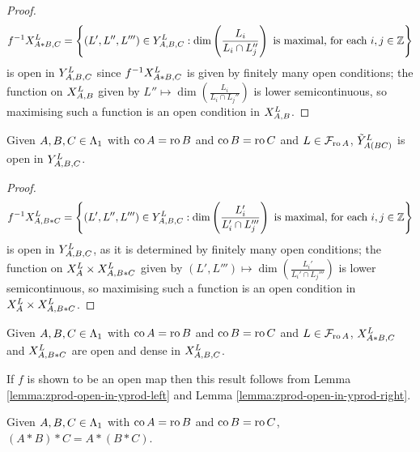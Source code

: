 \documentclass[a4paper, 11pt]{report}
\begin{document}
\begin{proof}
\begin{equation*}
f^{-1}\xprod[L]{A\ast B,C} = \left\{ (L',L'',L''')\in\yprod[L]{A,B,C}: \dim\left(\frac{L_i}{L_i\cap L_j''}\right) \text{ is maximal, for each }i,j\in\integers \right\}
\end{equation*}
is open in $\yprod[L]{A,B,C}$ since $f^{-1}\xprod[L]{A\ast B,C}$ is given by {\color{blue}finitely many} open conditions; the function on $\xprod[L]{A,B}$ given by $L''\mapsto \dim\left(\frac{L_i}{L_i\cap L_j''}\right)$ is lower semicontinuous, so maximising such a function is an open condition in $\xprod[L]{A,B}$.
\end{proof}

\begin{lemma}\label{lemma:zprod-open-in-yprod-right}
Given $A,B,C\in\matrices$ with $\co{A}=\ro{B}$ and $\co{B}=\ro{C}$ and $L\in\flags_{\ro{A}}$, $\zprod[L]{A(BC)}$ is open in $\yprod[L]{A,B,C}$.
\end{lemma}

\begin{proof}
\begin{equation*}
f^{-1}\xprod[L]{A,B\ast C} = \left\{ (L',L'',L''')\in\yprod[L]{A,B,C}: \dim\left(\frac{L_i'}{L_i'\cap L_j'''}\right) \text{ is maximal, for each }i,j\in\integers \right\}
\end{equation*}
is open in $\yprod[L]{A,B,C}$, as it is determined by {\color{blue}finitely many} open conditions; the function on $\xprod[L]{A}\times\xprod[L]{A,B\ast C}$ given by $(L',L''')\mapsto\dim\left(\frac{L_i'}{L_i'\cap L_j'''}\right)$ is lower semicontinuous, so maximising such a function is an open condition in $\xprod[L]{A}\times\xprod[L]{A,B\ast C}$.
\end{proof}

\begin{conjecture}\label{conjecture:open-embeddings-in-x}
Given $A,B,C\in\matrices$ with $\co{A}=\ro{B}$ and $\co{B}=\ro{C}$ and $L\in\flags_{\ro{A}}$, $\xprod[L]{A\ast B,C}$ and $\xprod[L]{A,B\ast C}$ are open and dense in $\xprod[L]{A,B,C}$.
\end{conjecture}

\begin{remark}
If $f$ is shown to be an open map then this result follows from Lemma \ref{lemma:zprod-open-in-yprod-left} and Lemma \ref{lemma:zprod-open-in-yprod-right}.
\end{remark}

\begin{proposition}\label{proposition:associativity}
Given $A,B,C\in\matrices$ with $\co{A}=\ro{B}$ and $\co{B}=\ro{C}$, $(A\ast B)\ast C = A\ast (B\ast C)$.
\end{proposition}
\end{document}
